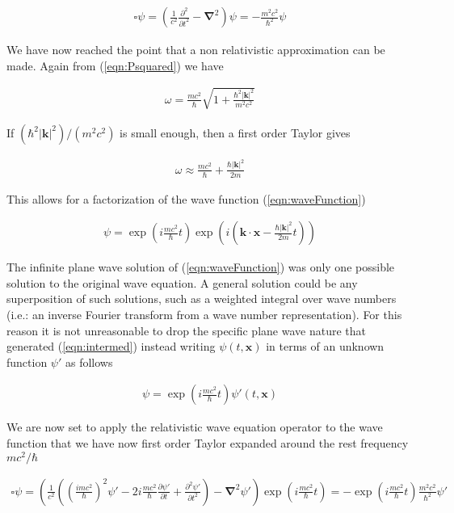 \documentclass[]{eliblog}
\newcommand{\Abs}[1]{{\left\lvert{#1}\right\rvert}}
\newcommand{\Bk}[0]{\mathbf{k}}
\newcommand{\Bx}[0]{\mathbf{x}}
\newcommand{\spacegrad}[0]{\boldsymbol{\nabla}}
\newcommand{\delambertian}[0]{\square}
\begin{document}
\begin{align}
\delambertian \psi = \left( \frac{1}{c^2}\frac{\partial^2}{{\partial t}^2} - \spacegrad^2 \right) \psi = - \frac{m^2 c^2}{\hbar^2} \psi
\end{align}

We have now reached the point that a non relativistic approximation can be made.
Again from (\ref{eqn:Psquared}) we have

\begin{align}
\omega = \frac{m c^2}{\hbar} \sqrt{ 1 + \frac{\hbar^2 \Abs{\Bk}^2}{m^2 c^2}}
\end{align}

If $(\hbar^2 \Abs{\Bk}^2)/(m^2 c^2)$ is small enough, then a first order Taylor gives

\begin{align}
\omega \approx \frac{m c^2}{\hbar} + \frac{\hbar \Abs{\Bk}^2}{2 m}
\end{align}

This allows for a factorization of the wave function (\ref{eqn:waveFunction})

\begin{align}\label{eqn:intermed}
\psi =
\exp\left( i \frac{m c^2}{\hbar} t \right)
\exp\left( i \left(
\Bk \cdot \Bx
-\frac{\hbar \Abs{\Bk}^2}{2 m}t
\right) \right)
\end{align}

The infinite plane wave solution of (\ref{eqn:waveFunction}) was only one possible solution to the original wave equation.
A general solution could be any superposition of such solutions, such as a weighted integral over wave numbers (i.e.: an
inverse Fourier transform from a wave number representation).  For this reason it is not unreasonable to drop the specific plane wave nature that generated (\ref{eqn:intermed}) instead writing $\psi(t,\Bx)$ in terms of an unknown function $\psi'$ as follows

\begin{align}
\psi = \exp\left( i \frac{m c^2}{\hbar} t \right) \psi'(t, \Bx)
\end{align}

We are now set to apply the relativistic wave equation operator to the wave function that we have now first order Taylor expanded
around the rest frequency $m c^2/\hbar$

\begin{align}
\delambertian \psi
=
\left(
\frac{1}{c^2}
\left(
\left( \frac{i m c^2}{\hbar} \right)^2 \psi' - 2 i \frac{m c^2}{\hbar} \frac{\partial \psi'}{\partial t} +
\frac{\partial^2 \psi'}{\partial t^2}
\right)
-
\spacegrad^2 \psi'
\right)
\exp\left( i \frac{m c^2}{\hbar} t \right)
= -
\exp\left( i \frac{m c^2}{\hbar} t \right)
\frac{m^2 c^2}{\hbar^2} \psi'
\end{align}
\end{document}
